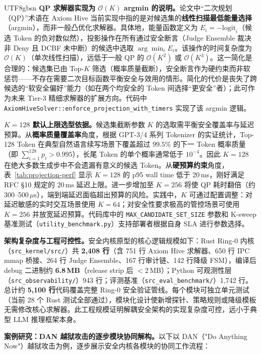 \documentclass[letterpaper,twocolumn,10pt]{article}
\begin{document}
\begin{CJK}{UTF8}{gbsn}
\textbf{QP 求解器实现为 $\mathcal{O}(K)$ argmin 的说明。}论文中``二次规划（QP）''术语在 Axiom Hive 当前实现中指的是对候选集的\textbf{线性扫描最低能量选择}（argmin），而非一般凸优化求解器。具体地，能量函数定义为 $E_i = -\mathrm{logit}_i$（候选 Token 的负对数似然），投影操作在所有通过安全断言（Judge Ensemble 裁决非 Deny 且 DCBF 未中断）的候选中选取 $\arg\min_i E_i$。该操作的时间复杂度为 $\mathcal{O}(K)$（单次线性扫描），远低于一般 QP 的 $\mathcal{O}(K^2)$ 或 $\mathcal{O}(K^3)$。这一简化是合理的：候选集已由 Top-$K$ 筛选（概率质量截断），安全断言作为硬约束而非软惩罚——不存在需要二次目标函数平衡安全与效用的情形。简化的代价是丧失了跨候选的``软安全偏好''能力（如在两个均安全的 Token 间选择``更安全''者）；此可作为未来 Tier-3 精细求解器的扩展方向。代码中 \texttt{AxiomHiveSolver::enforce\_projection\_with\_timers} 实现了该 argmin 逻辑。

\textbf{$K=128$ 默认上限选型依据。}候选集截断参数 $K$ 的选取需平衡安全覆盖率与延迟预算。从\textbf{概率质量覆盖率}角度，根据 GPT-3/4 系列 Tokenizer 的实证统计，Top-128 Token 在典型自然语言续写场景下覆盖超过 $99.5\%$ 的下一 Token 概率质量（即 $\sum_{i=1}^{128} p_i > 0.995$），长尾 Token 的单个概率通常低于 $10^{-4}$。因此 $K=128$ 在绝大多数生成步中不会遗漏有意义的候选 Token。从\textbf{硬预算约束}角度，表~\ref{tab:projection-perf} 显示 $K=128$ 的 p95 wall time 低于 20\,ms，刚好满足 RFC \S 10 规定的 20\,ms 延迟上限。进一步增加至 $K=256$ 将使 QP 耗时翻倍（约 300--500\,$\mu$s），端到端延迟面临超出预算的风险。实践中，$K$ 可通过配置调整：对延迟敏感的实时交互场景使用 $K=64$；对安全性要求极高的管控场景可使用 $K=256$ 并放宽延迟预算。代码库中的 \texttt{MAX\_CANDIDATE\_SET\_SIZE} 参数和 K-sweep 基准测试（\texttt{utility\_benchmark.py}）支持部署者根据自身 SLA 进行参数选择。

\textbf{架构复杂度与工程可控性。}安全内核原型的核心逻辑规模如下：Rust Ring-0 内核（\texttt{src\_kernel/src/}）共 \textbf{2,408 行}（含 751 行 Axiom Hive 求解器、650 行 IPC mmap 桥接、264 行 Judge Ensemble、167 行审计链、142 行降级 FSM），编译后 debug 二进制约 \textbf{6.8\,MB}（release strip 后 $<$2\,MB）；Python 可观测性层（\texttt{src\_observability/}）943 行；评测基准（\texttt{src\_eval\_benchmark/}）1,742 行。总计约 \textbf{5,100 行}代码覆盖完整 Ring-0 安全验证管线。每个模块可独立单元测试（当前 28 个 Rust 测试全部通过），模块化设计使新增探针、策略规则或降级模板无需修改核心求解器。此工程规模证明解耦安全架构的实现复杂度可控，远小于典型 LLM 推理框架本身。

\textbf{案例研究：DAN 越狱攻击的逐步模块协同解构。}以下以 DAN（"Do Anything Now"）越狱攻击为例，逐步展示安全内核各模块的协同工作流程：


\end{CJK}
\end{document}
